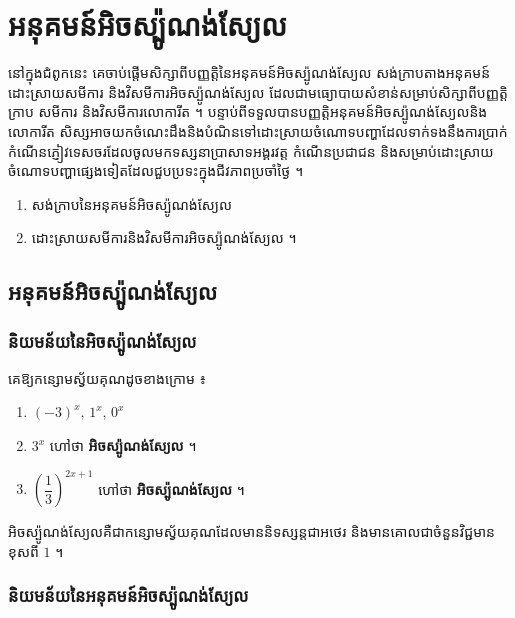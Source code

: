 \chapter{អនុគមន៍អិចស្ប៉ូណង់ស្យែល}

នៅក្នុងជំពូកនេះ គេចាប់ផ្តើមសិក្សាពីបញ្ញត្តិនៃអនុគមន៍អិចស្ប៉ូណង់ស្យែល សង់ក្រាបតាងអនុគមន៍ ដោះស្រាយសមីការ និងវិសមីការអិចស្ប៉ូណង់ស្យែល ដែលជាមធ្យោបាយសំខាន់សម្រាប់សិក្សាពីបញ្ញត្តិ ក្រាប សមីការ និងវិសមីការលោការីត ។ បន្ទាប់ពីទទួលបានបញ្ញត្តិអនុគមន៍អិចស្ប៉ូណង់ស្យែលនិងលោការីត សិស្សអាចយកចំណេះដឹងនិងបំណិនទៅដោះស្រាយចំណោទបញ្ហាដែលទាក់ទងនឹងការប្រាក់ កំណើនភ្ញៀវទេសចរដែលចូលមកទស្សនាប្រាសាទអង្គរវត្ត កំណើនប្រជាជន និងសម្រាប់ដោះស្រាយចំណោទបញ្ហាផ្សេងទៀតដែលជួបប្រទះក្នុងជីវភាពប្រចាំថ្ងៃ ។

\begin{objBox}[វត្ថុបំណង]
\begin{enumerate}[1]
  \item សង់ក្រាបនៃអនុគមន៍អិចស្ប៉ូណង់ស្យែល
  \item ដោះស្រាយសមីការនិងវិសមីការអិចស្ប៉ូណង់ស្យែល ។
\end{enumerate}
\end{objBox}

\section{អនុគមន៍អិចស្ប៉ូណង់ស្យែល}

\subsection{និយមន័យនៃអិចស្ប៉ូណង់ស្យែល}

\begin{example}[ឧទាហរណ៍]
គេឱ្យកន្សោមស្វ័យគុណដូចខាងក្រោម ៖
\begin{enumerate}[a]
  \item $(-3)^x$, $1^x$, $0^x$
  \item $3^x$ ហៅថា \textbf{អិចស្ប៉ូណង់ស្យែល} ។
  \item $\left(\dfrac{1}{3}\right)^{2x+1}$ ហៅថា \textbf{អិចស្ប៉ូណង់ស្យែល} ។
\end{enumerate}
\end{example}

\begin{definition}
អិចស្ប៉ូណង់ស្យែលគឺជាកន្សោមស្វ័យគុណដែលមាននិទស្សន្តជាអថេរ និងមានគោលជាចំនួនវិជ្ជមានខុសពី $1$ ។
\end{definition}

\subsection{និយមន័យនៃអនុគមន៍អិចស្ប៉ូណង់ស្យែល}

